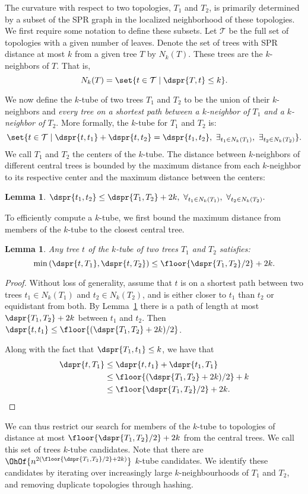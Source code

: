 \documentclass{amsart}
\newtheorem{lemma}[theorem]{Lemma}
\newcommand{\TT}{\mathcal T}
\begin{document}
The curvature with respect to two topologies, $T_1$ and $T_2$, is primarily determined by a subset of the SPR graph in the localized neighborhood of these topologies.
We first require some notation to define these subsets.
Let $\TT$ be the full set of topologies with a given number of leaves.
Denote the set of trees with SPR distance at most $k$ from a given tree $T$ by $N_k(T)$.
These trees are the $k$-neighbors of $T$.
That is, $$ N_k(T) = \set{t \in \TT \mid \dspr{T, t} \le k} .$$

We now define the $k$-tube of two trees $T_1$ and $T_2$ to be the union of their $k$-neighbors and \emph{every tree on a shortest path between a $k$-neighbor of $T_1$ and a $k$-neighbor of $T_2$}.
More formally, the $k$-tube for $T_1$ and $T_2$ is:
\[ \set{t \in \TT \mid \dspr{t, t_1} + \dspr{t, t_2} = \dspr{t_1, t_2},\ \exists_{t_1 \in N_k(T_1)},\ \exists_{t_2 \in N_k(T_2)} } .\]
We call $T_1$ and $T_2$ the centers of the $k$-tube.
The distance between $k$-neighbors of different central trees is bounded by the maximum distance from each $k$-neighbor to its respective center and the maximum distance between the centers:

\begin{lemma}
	\label{lem:neighbor_distance}
	$\dspr{t_1, t_2} \le \dspr{T_1, T_2} + 2k,\ \forall_{t_1 \in N_k(T_1)},\ \forall_{t_2 \in N_k(T_2)}.$
\end{lemma}

To efficiently compute a $k$-tube, we first bound the maximum distance from members of the $k$-tube to the closest central tree.
\begin{lemma}
	\label{lem:k_tube_distance}
	Any tree $t$ of the $k$-tube of two trees $T_1$ and $T_2$ satisfies:
	\[ \min\left({\dspr{t, T_1}, \dspr{t, T_2}}\right) \le \floor{\dspr{T_1, T_2}/2} + 2k .\]
\end{lemma}
\begin{proof}
Without loss of generality, assume that $t$ is on a shortest path between two trees $t_1 \in N_k(T_1)$ and $t_2 \in N_k(T_2)$, and is either closer to $t_1$ than $t_2$ or equidistant from both.
By Lemma~\ref{lem:neighbor_distance} there is a path of length at most $\dspr{T_1, T_2} + 2k$ between $t_1$ and $t_2$.
Then $\dspr{t, t_1} \le \floor{(\dspr{T_1, T_2} + 2k) / 2}$.

Along with the fact that $\dspr{T_1, t_1} \le k$, we have that
\begin{align*}
\dspr{t, T_1} &\le \dspr{t, t_1} + \dspr{t_1, T_1} \\
&\le \floor{(\dspr{T_1, T_2} + 2k) / 2} + k \\
&\le \floor{\dspr{T_1, T_2} / 2} + 2k.
\end{align*}

\end{proof}
We can thus restrict our search for members of the $k$-tube to topologies of distance at most $\floor{\dspr{T_1, T_2}/2} + 2k$ from the central trees.
We call this set of trees $k$-tube candidates.
Note that there are $\OhOf{n^{2(\floor{\dspr{T_1, T_2}/2} + 2k)}}$ $k$-tube candidates.
We identify these candidates by iterating over increasingly large $k$-neighbourhoods of $T_1$ and $T_2$, and removing duplicate topologies through hashing.
\end{document}
